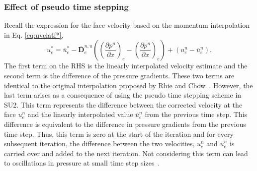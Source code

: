 \subsubsection{Effect of pseudo time stepping}
Recall the expression for the face velocity based on the momentum interpolation in Eq. \ref{eq:uvelatf*}, 
\begin{equation*}
u_{e}^{\ast}=\overline{u}_{e}^{\ast}-\overline{\boldsymbol{D}}_{e}^{n,u}\left(\left(\frac{\partial p^n}{\partial x}\right)_{e}-\overline{\left(\frac{\partial p^n}{\partial x}\right)_{e}}\right) + \left(u_{e}^n - \overline{u}_{e}^n\right).
\end{equation*}
The first term on the RHS is the linearly interpolated velocity estimate and the second term is the difference of the pressure gradients. These two terms are identical to the original interpolation proposed by Rhie and Chow~\cite{Rhie1983}. However, the last term arises as a consequence of using the pseudo time stepping scheme in SU2. This term represents the difference between the corrected velocity at the face $u_e^n$ and the linearly interpolated value $\overline{u}_e^n$ from the previous time step. This difference is equivalent to the difference in pressure gradients from the previous time step. Thus, this term is zero at the start of the iteration and for every subsequent iteration, the difference between the two velocities, $u_e^n$ and $\overline{u}_e^n$ is carried over and added to the next iteration. Not considering this term can lead to oscillations in pressure at small time step sizes~\cite{Majumdar1988, Choi1999, Yu2002, Shen2012, Cubero2007, Bartholomew2018}.

